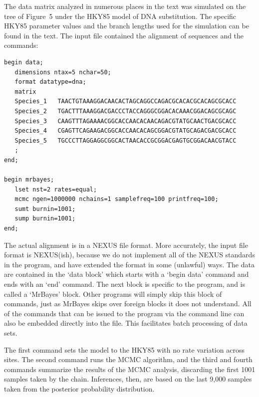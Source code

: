 \documentclass{svmult}
\begin{document}
 The data matrix analyzed in numerous places in the text was simulated on the
tree of Figure~5 under the HKY85 model of DNA substitution. The specific HKY85 parameter values and the branch lengths used for the
simulation can be found in the text. The input file contained the alignment of sequences and the commands:
\scriptsize
 \begin{verbatim}
begin data;
   dimensions ntax=5 nchar=50;
   format datatype=dna;
   matrix
   Species_1   TAACTGTAAAGGACAACACTAGCAGGCCAGACGCACACGCACAGCGCACC 
   Species_2   TGACTTTAAAGGACGACCCTACCAGGGCGGACACAAACGGACAGCGCAGC 
   Species_3   CAAGTTTAGAAAACGGCACCAACACAACAGACGTATGCAACTGACGCACC 
   Species_4   CGAGTTCAGAAGACGGCACCAACACAGCGGACGTATGCAGACGACGCACC 
   Species_5   TGCCCTTAGGAGGCGGCACTAACACCGCGGACGAGTGCGGACAACGTACC 
   ;
end;

begin mrbayes;
   lset nst=2 rates=equal;
   mcmc ngen=1000000 nchains=1 samplefreq=100 printfreq=100;
   sumt burnin=1001;
   sump burnin=1001;
end;

\end{verbatim}
\normalsize
The actual alignment is in a NEXUS file format. More accurately, the input file format
is NEXUS(ish), because we do not implement all of the NEXUS standards in the program, and have
extended the format in some (unlawful) ways. The data are contained in the `data block' which starts
with a `begin data' command and ends with an `end' command. The next block is specific to
the program, and is called a `MrBayes'  block. Other programs will simply skip this block of commands,
just as MrBayes skips over foreign blocks it does not understand. All of the commands that can be issued
to the program via the command line can also be embedded directly into the file. This facilitates batch
processing of data sets. 

The first command sets the model to the HKY85 with no rate variation across sites. The second command runs
the MCMC algorithm, and the third and fourth commands summarize the results of the MCMC analysis, discarding
the first 1001 samples taken by the chain. Inferences, then, are based on the last 9,000 samples taken from the
posterior probability distribution.

\bigskip
\end{document}
